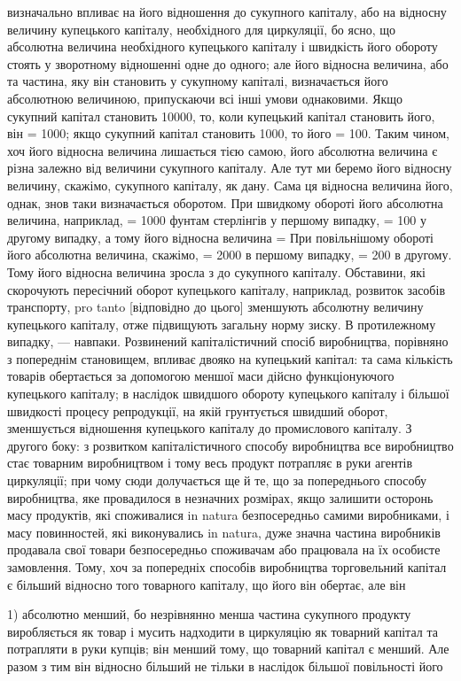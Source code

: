 \parcont{}  %
визначально впливає на його відношення до сукупного капіталу,
або на відносну величину купецького капіталу, необхідного для
циркуляції, бо ясно, що абсолютна величина необхідного купецького
капіталу і швидкість його обороту стоять у зворотному
відношенні одне до одного; але його відносна величина, або та
частина, яку він становить у сукупному капіталі, визначається
його абсолютною величиною, припускаючи всі інші умови
однаковими. Якщо сукупний капітал становить 10000, то, коли
купецький капітал становить  його, він = 1000; якщо сукупний
капітал становить 1000, то   його = 100. Таким чином, хоч
його відносна величина лишається тією самою, його абсолютна
величина є різна залежно від величини сукупного капіталу. Але
тут ми беремо його відносну величину, скажімо,   сукупного капіталу,
як дану. Сама ця відносна величина його, однак, знов таки
визначається оборотом. При швидкому обороті його абсолютна величина,
наприклад, = 1000 фунтам стерлінгів у першому випадку,
= 100 у другому випадку, а тому його відносна величина = 
При повільнішому обороті його абсолютна величина, скажімо, =
2000 в першому випадку, = 200 в другому. Тому його відносна
величина зросла з   до  сукупного капіталу. Обставини,
які скорочують пересічний оборот купецького капіталу, наприклад,
розвиток засобів транспорту, pro tanto [відповідно до цього]
зменшують абсолютну величину купецького капіталу, отже
підвищують загальну норму зиску. В протилежному випадку, —
навпаки. Розвинений капіталістичний спосіб виробництва, порівняно
з попереднім становищем, впливає двояко на купецький
капітал: та сама кількість товарів обертається за допомогою
меншої маси дійсно функціонуючого купецького капіталу; в наслідок
швидшого обороту купецького капіталу і більшої швидкості
процесу репродукції, на якій грунтується швидший оборот,
зменшується відношення купецького капіталу до промислового
капіталу. З другого боку: з розвитком капіталістичного способу
виробництва все виробництво стає товарним виробництвом і тому
весь продукт потрапляє в руки агентів циркуляції; при чому
сюди долучається ще й те, що за попереднього способу виробництва,
яке провадилося в незначних розмірах, якщо залишити
осторонь масу продуктів, які споживалися in natura безпосередньо
самими виробниками, і масу повинностей, які виконувались
in natura, дуже значна частина виробників продавала свої
товари безпосередньо споживачам або працювала на їх особисте
замовлення. Тому, хоч за попередніх способів виробництва торговельний
капітал є більший відносно того товарного капіталу,
що його він обертає, але він

1) абсолютно менший, бо незрівнянно менша частина сукупного
продукту виробляється як товар і мусить надходити в циркуляцію
як товарний капітал та потрапляти в руки купців; він менший
тому, що товарний капітал є менший. Але разом з тим він відносно
більший не тільки в наслідок більшої повільності його
\parbreak{}  %
